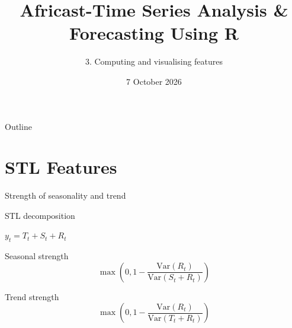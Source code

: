 \documentclass[
  14pt,
  ignorenonframetext,
  aspectratio=169,
]{beamer}
\title{\texorpdfstring{Africast-Time Series Analysis \& Forecasting
Using R}{Africast-Time Series Analysis \& Forecasting Using R}}
\subtitle{\texorpdfstring{3. Computing and visualising
features}{3. Computing and visualising features}}
\author{}
\date{7 October 2026}
\begin{document}
\frame{\titlepage}


\begin{frame}{Outline}
\protect{}\label{outline}
\vspace*{0.7cm}\tableofcontents
\end{frame}

\section{STL Features}\label{stl-features}

\begin{frame}{Strength of seasonality and trend}
\protect{}\label{strength-of-seasonality-and-trend}
\begin{alertblock}{STL decomposition}
\centerline{$y_t = T_t+S_t+R_t$}
\end{alertblock}

\begin{block}{Seasonal strength}
\protect{}\label{seasonal-strength}
\[\max\left(0, 1-\frac{\text{Var}(R_t)}{\text{Var}(S_t+R_t)}\right)\]
\end{block}

\begin{block}{Trend strength}
\protect{}\label{trend-strength}
\[\max\left(0, 1-\frac{\text{Var}(R_t)}{\text{Var}(T_t+R_t)}\right)\]
\end{block}
\end{frame}
\end{document}
